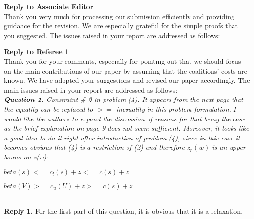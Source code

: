\documentclass[11pt]{article}
\begin{document}

\newpage

\noindent \textbf{\large Reply to Associate Editor}
\\[3mm]
Thank you very much for processing our submission efficiently and providing guidance for the revision.
We are especially grateful for the simple proofs that you suggested.
The issues raised in your report are addressed as follows:
\\[4mm]


\newpage

\noindent \textbf{\large Reply to Referee 1}
\\[3mm]
Thank you for your comments, especially for pointing out that we should focus on the main contributions of our paper by assuming that the coalitions' costs are known. We have adopted your suggestions and revised our paper accordingly. The main issues raised in your report are addressed as follows:
\\[4mm]
%
%
\noindent \textit{\textbf{Question 1.}
Constraint \# 2 in problem (4). It appears from the next page that the equality can be replaced to $>=$ inequality in this problem formulation. I would like the authors to expand the discussion of reasons for that being the case as the brief explanation on page 9 does not seem sufficient. Moreover, it looks like a good idea to do it right after introduction of problem (4), since in this case it becomes obvious that (4) is a restriction of (2) and therefore $z_r(w)$ is an upper bound on z(w):}

$beta(s) <= c_l(s) + z <= c(s) + z$

$beta(V) >= c_u(U) + z >= c(s) + z$

\\[2mm]
\noindent \textbf{Reply 1.}
For the first part of this question, it is obvious that it is a relaxation.
\end{document}
